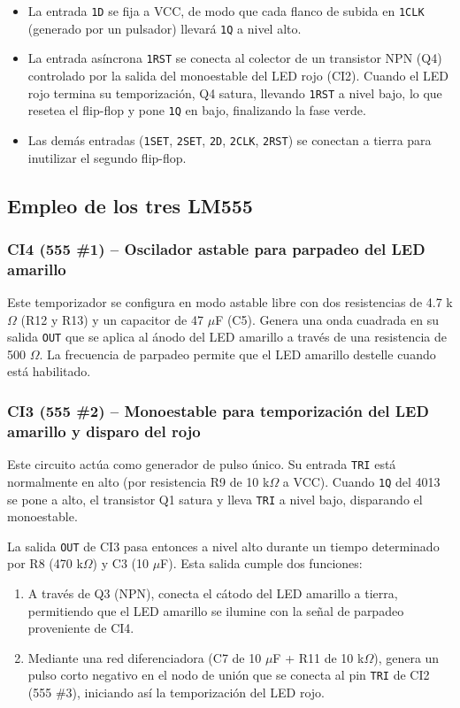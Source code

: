 \documentclass[journal]{IEEEtran}
\begin{document}
\begin{itemize}
    \item La entrada \texttt{1D} se fija a VCC, de modo que cada flanco de subida en \texttt{1CLK} (generado por un pulsador) llevará \texttt{1Q} a nivel alto. 
    \item La entrada asíncrona \texttt{1RST} se conecta al colector de un transistor NPN (Q4) controlado por la salida del monoestable del LED rojo (CI2). Cuando el LED rojo termina su temporización, Q4 satura, llevando \texttt{1RST} a nivel bajo, lo que resetea el flip-flop y pone \texttt{1Q} en bajo, finalizando la fase verde.
    \item Las demás entradas (\texttt{1SET}, \texttt{2SET}, \texttt{2D}, \texttt{2CLK}, \texttt{2RST}) se conectan a tierra para inutilizar el segundo flip-flop.
\end{itemize}

\subsection{Empleo de los tres LM555}

\subsubsection{CI4 (555 \#1) – Oscilador astable para parpadeo del LED amarillo}

Este temporizador se configura en modo astable libre con dos resistencias de 4.7 k$\Omega$ (R12 y R13) y un capacitor de 47 $\mu$F (C5). Genera una onda cuadrada en su salida \texttt{OUT} que se aplica al ánodo del LED amarillo a través de una resistencia de 500 $\Omega$. La frecuencia de parpadeo permite que el LED amarillo destelle cuando está habilitado.

\subsubsection{CI3 (555 \#2) – Monoestable para temporización del LED amarillo y disparo del rojo}

Este circuito actúa como generador de pulso único. Su entrada \texttt{TRI} está normalmente en alto (por resistencia R9 de 10 k$\Omega$ a VCC). Cuando \texttt{1Q} del 4013 se pone a alto, el transistor Q1 satura y lleva \texttt{TRI} a nivel bajo, disparando el monoestable. 

La salida \texttt{OUT} de CI3 pasa entonces a nivel alto durante un tiempo determinado por R8 (470 k$\Omega$) y C3 (10 $\mu$F). Esta salida cumple dos funciones:
\begin{enumerate}
    \item A través de Q3 (NPN), conecta el cátodo del LED amarillo a tierra, permitiendo que el LED amarillo se ilumine con la señal de parpadeo proveniente de CI4.
    \item Mediante una red diferenciadora (C7 de 10 $\mu$F + R11 de 10 k$\Omega$), genera un pulso corto negativo en el nodo de unión que se conecta al pin \texttt{TRI} de CI2 (555 \#3), iniciando así la temporización del LED rojo.
\end{enumerate}
\end{document}
